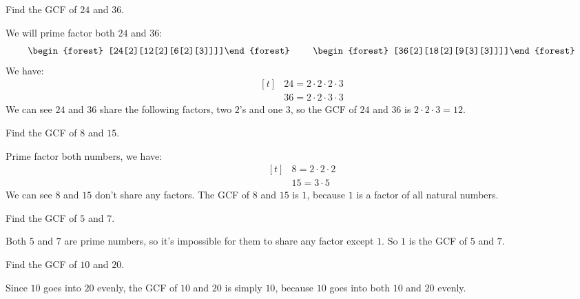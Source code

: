 \begin{myexample}
Find the GCF of $24$ and $36$.
\end{myexample}
\begin{solution}
We will prime factor both $24$ and $36$:
\[
\begin{tabular}{ l c r }
  \begin{forest} [24[2][12[2][6[2][3]]]]\end{forest} &  & \begin{forest} [36[2][18[2][9[3][3]]]]\end{forest} \\
\end{tabular}
\]
We have:
\[
\begin{aligned}[t]
&24=2\cdot2\cdot2\cdot3 \\
&36=2\cdot2\cdot3\cdot3
\end{aligned}
\]
We can see $24$ and $36$ share the following factors, two $2$'s and one $3$, so the GCF of $24$ and $36$ is $2\cdot2\cdot3=12$.
\end{solution}

\begin{myexample}
Find the GCF of $8$ and $15$.
\end{myexample}
\begin{solution}
Prime factor both numbers, we have:
\[
\begin{aligned}[t]
&8=2\cdot2\cdot2 \\
&15=3\cdot5
\end{aligned}
\]
We can see $8$ and $15$ don't share any factors. The GCF of $8$ and $15$ is $1$, because $1$ is a factor of all natural numbers.
\end{solution}

\begin{myexample}
Find the GCF of $5$ and $7$.
\end{myexample}
\begin{solution}
Both $5$ and $7$ are prime numbers, so it's impossible for them to share any factor except $1$. So $1$ is the GCF of $5$ and $7$.
\end{solution}

\begin{myexample}
Find the GCF of $10$ and $20$.
\end{myexample}
\begin{solution}
Since $10$ goes into $20$ evenly, the GCF of $10$ and $20$ is simply $10$, because $10$ goes into both $10$ and $20$ evenly.
\end{solution}

